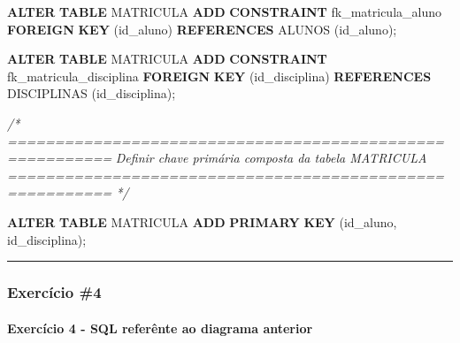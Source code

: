 \documentclass[
]{book}
\makeatletter
\newenvironment{Shaded}{\begin{snugshade}}{\end{snugshade}}
\newcommand{\CommentTok}[1]{\textcolor[rgb]{0.56,0.35,0.01}{\textit{#1}}}
\newcommand{\KeywordTok}[1]{\textcolor[rgb]{0.13,0.29,0.53}{\textbf{#1}}}
\newcommand{\NormalTok}[1]{#1}
\newcommand*\pandocbounded[1]{%
  \sbox\pandoc@box{#1}%
  \Gscale@div\@tempa{\textheight}{\dimexpr\ht\pandoc@box+\dp\pandoc@box\relax}%
  \Gscale@div\@tempb{\linewidth}{\wd\pandoc@box}%
  \ifdim\@tempb\p@<\@tempa\p@\let\@tempa\@tempb\fi%
  \ifdim\@tempa\p@<\p@\scalebox{\@tempa}{\usebox\pandoc@box}%
  \else\usebox{\pandoc@box}%
  \fi%
}
\makeatother
\begin{document}
\begin{Shaded}
\begin{Highlighting}[]
\KeywordTok{ALTER} \KeywordTok{TABLE}\NormalTok{ MATRICULA }\KeywordTok{ADD} \KeywordTok{CONSTRAINT}\NormalTok{ fk\_matricula\_aluno }\KeywordTok{FOREIGN} \KeywordTok{KEY}\NormalTok{ (id\_aluno) }\KeywordTok{REFERENCES}\NormalTok{ ALUNOS (id\_aluno);}

\KeywordTok{ALTER} \KeywordTok{TABLE}\NormalTok{ MATRICULA }\KeywordTok{ADD} \KeywordTok{CONSTRAINT}\NormalTok{ fk\_matricula\_disciplina }\KeywordTok{FOREIGN} \KeywordTok{KEY}\NormalTok{ (id\_disciplina) }\KeywordTok{REFERENCES}\NormalTok{ DISCIPLINAS (id\_disciplina);}

\CommentTok{/* =========================================================}
\CommentTok{   Definir chave primária composta da tabela MATRICULA}
\CommentTok{   ========================================================= */}

\KeywordTok{ALTER} \KeywordTok{TABLE}\NormalTok{ MATRICULA }\KeywordTok{ADD} \KeywordTok{PRIMARY} \KeywordTok{KEY}\NormalTok{ (id\_aluno, id\_disciplina);}
\end{Highlighting}
\end{Shaded}

\begin{center}\rule{0.5\linewidth}{0.5pt}\end{center}

\subsubsection{Exercício \#4}\label{exercuxedcio-4-1}

\pandocbounded{}

\paragraph{Exercício 4 - SQL referênte ao diagrama anterior}\label{exercuxedcio-4---sql-referuxeante-ao-diagrama-anterior-1}
\end{document}
